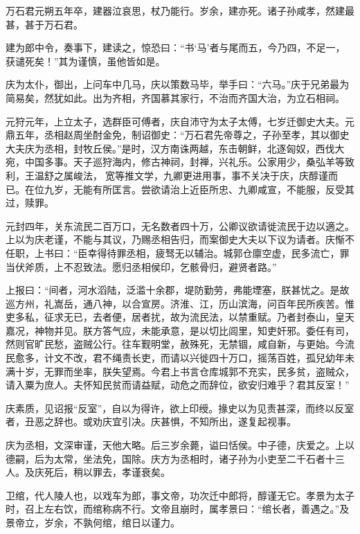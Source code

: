 \documentclass[12pt,UTF8]{ctexbook}
\begin{document}
万石君元朔五年卒，建器泣哀思，杖乃能行。岁余，建亦死。诸子孙咸孝，然建最甚，甚于万石君。



建为郎中令，奏事下，建读之，惊恐曰：“书‘马’者与尾而五，今乃四，不足一，获谴死矣！”其为谨慎，虽他皆如是。



庆为太仆，御出，上问车中几马，庆以策数马毕，举手曰：“六马。”庆于兄弟最为简易矣，然犹如此。出为齐相，齐国慕其家行，不治而齐国大治，为立石相祠。



元狩元年，上立太子，选群臣可傅者，庆自沛守为太子太傅，七岁迁御史大夫。元鼎五年，丞相赵周坐酎金免，制诏御史：“万石君先帝尊之，子孙至孝，其以御史大夫庆为丞相，封牧丘侯。”是时，汉方南诛两越，东击朝鲜，北逐匈奴，西伐大宛，中国多事。天子巡狩海内，修古神祠，封禅，兴礼乐。公家用少，桑弘羊等致利，王温舒之属峻法，宽等推文学，九卿更进用事，事不关决于庆，庆醇谨而已。在位九岁，无能有所匡言。尝欲请治上近臣所忠、九卿咸宣，不能服，反受其过，赎罪。



元封四年，关东流民二百万口，无名数者四十万，公卿议欲请徙流民于边以適之。上以为庆老谨，不能与其议，乃赐丞相告归，而案御史大夫以下议为请者。庆惭不任职，上书曰：“臣幸得待罪丞相，疲驽无以辅治。城郭仓廪空虚，民多流亡，罪当伏斧质，上不忍致法。愿归丞相侯印，乞骸骨归，避贤者路。”



上报曰：“间者，河水滔陆，泛滥十余郡，堤防勤劳，弗能堙塞，朕甚忧之。是故巡方州，礼嵩岳，通八神，以合宣房。济淮、江，历山滨海，问百年民所疾苦。惟吏多私，征求无已，去者便，居者扰，故为流民法，以禁重赋。乃者封泰山，皇天嘉况，神物并见。朕方答气应，未能承意，是以切比闾里，知吏奸邪。委任有司，然则官旷民愁，盗贼公行。往车觐明堂，赦殊死，无禁锢，咸自新，与更始。今流民愈多，计文不改，君不绳责长吏，而请以兴徙四十万口，摇荡百姓，孤兒幼年未满十岁，无罪而坐率，朕失望焉。今君上书言仓库城郭不充实，民多贫，盗贼众，请入粟为庶人。夫怀知民贫而请益赋，动危之而辞位，欲安归难乎？君其反室！”



庆素质，见诏报“反室”，自以为得许，欲上印绶。掾史以为见责甚深，而终以反室者，丑恶之辞也。或劝庆宜引决。庆甚惧，不知所出，遂复起视事。



庆为丞相，文深审谨，天他大略。后三岁余薨，谥曰恬侯。中子德，庆爱之。上以德嗣，后为太常，坐法免，国除。庆方为丞相时，诸子孙为小吏至二千石者十三人。及庆死后，稍以罪去，孝谨衰矣。



卫绾，代人陵人也，以戏车为郎，事文帝，功次迁中郎将，醇谨无它。孝景为太子时，召上左右饮，而绾称病不行。文帝且崩时，属孝景曰：“绾长者，善遇之。”及景帝立，岁余，不孰何绾，绾日以谨力。
\end{document}
